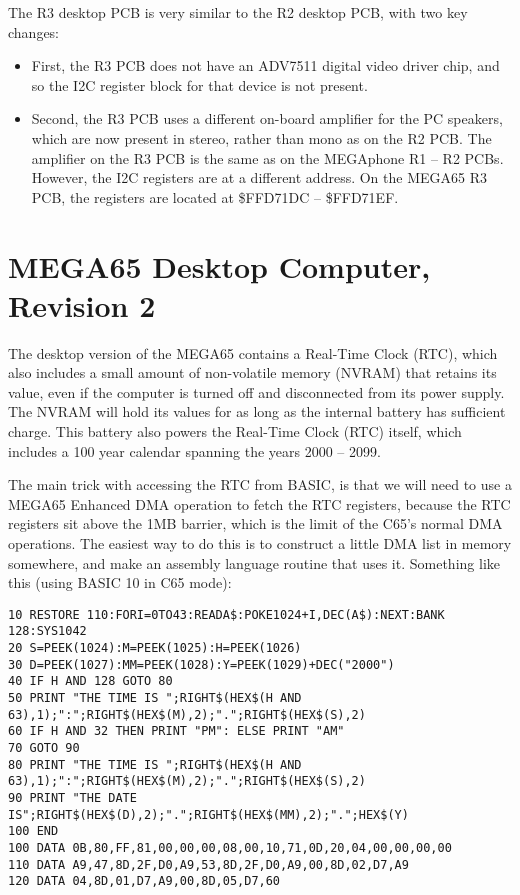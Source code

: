The R3 desktop PCB is very similar to the R2 desktop PCB, with two key changes:

\begin{itemize}
\item First, the R3 PCB does not have an ADV7511 digital video driver chip, and so the I2C register block for that device is not present.
\item Second, the R3 PCB uses a different on-board amplifier for the PC speakers, which are now present in stereo, rather than mono
  as on the R2 PCB.  The amplifier on the R3 PCB is the same as on the MEGAphone R1 -- R2 PCBs.
  However, the I2C registers are at a different address.  On the MEGA65 R3 PCB, the registers are located at \$FFD71DC -- \$FFD71EF.
\end{itemize}



\section{MEGA65 Desktop Computer, Revision 2}

The desktop version of the MEGA65 contains a Real-Time Clock (RTC), which also includes a small amount of non-volatile memory (NVRAM)
that retains its value, even if the computer is turned off and disconnected from its power supply. The NVRAM will hold its values
for as long as the internal battery has sufficient charge.  This battery also powers the Real-Time Clock (RTC) itself, which includes
a 100 year calendar spanning the years 2000 -- 2099.

The main trick with accessing the RTC from BASIC, is that we will need to use a MEGA65 Enhanced DMA operation to fetch the RTC registers, because the RTC registers sit above the 1MB barrier, which is the limit of the C65's normal DMA operations.  The easiest way to do this is to construct a little DMA list in memory somewhere, and make an assembly language routine that uses it.  Something like this (using BASIC 10 in C65 mode):

\begin{tcolorbox}[colback=black,coltext=white]
\verbatimfont{\codefont}
\begin{verbatim}
10 RESTORE 110:FORI=0TO43:READA$:POKE1024+I,DEC(A$):NEXT:BANK 128:SYS1042
20 S=PEEK(1024):M=PEEK(1025):H=PEEK(1026)
30 D=PEEK(1027):MM=PEEK(1028):Y=PEEK(1029)+DEC("2000")
40 IF H AND 128 GOTO 80
50 PRINT "THE TIME IS ";RIGHT$(HEX$(H AND 63),1);":";RIGHT$(HEX$(M),2);".";RIGHT$(HEX$(S),2)
60 IF H AND 32 THEN PRINT "PM": ELSE PRINT "AM"
70 GOTO 90
80 PRINT "THE TIME IS ";RIGHT$(HEX$(H AND 63),1);":";RIGHT$(HEX$(M),2);".";RIGHT$(HEX$(S),2)
90 PRINT "THE DATE IS";RIGHT$(HEX$(D),2);".";RIGHT$(HEX$(MM),2);".";HEX$(Y)
100 END
100 DATA 0B,80,FF,81,00,00,00,08,00,10,71,0D,20,04,00,00,00,00
110 DATA A9,47,8D,2F,D0,A9,53,8D,2F,D0,A9,00,8D,02,D7,A9
120 DATA 04,8D,01,D7,A9,00,8D,05,D7,60
\end{verbatim}
\end{tcolorbox}


